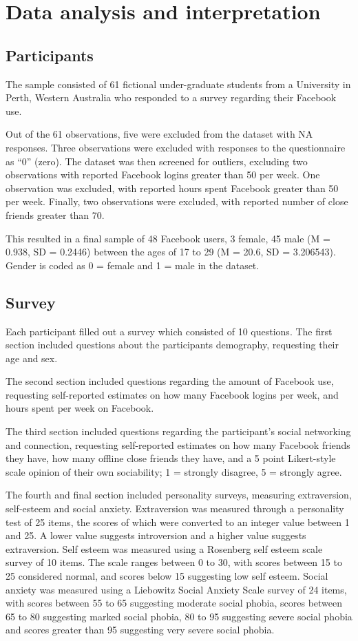 \newpage
\section{Data analysis and interpretation}

\subsection{Participants}

The sample consisted of 61 fictional under-graduate students from a University in Perth, Western Australia who responded to a survey regarding their Facebook use. 

Out of the 61 observations, five were excluded from the dataset with NA responses. Three observations were excluded with responses to the questionnaire as ``0'' (zero). The dataset was then screened for outliers, excluding two observations with reported Facebook logins greater than 50 per week. One observation was excluded, with reported hours spent Facebook greater than 50 per week. Finally, two observations were excluded, with reported number of close friends greater than 70.

This resulted in a final sample of 48 Facebook users, 3 female, 45 male (M = 0.938, SD = 0.2446) between the ages of 17 to 29 (M = 20.6, SD = 3.206543). Gender is coded as 0 = female and 1 = male in the dataset.

\subsection{Survey}

Each participant filled out a survey which consisted of 10 questions. The first section included questions about the participants demography, requesting their age and sex. 

The second section included questions regarding the amount of Facebook use, requesting self-reported estimates on how many Facebook logins per week, and hours spent per week on Facebook. 

The third section included questions regarding the participant's social networking and connection, requesting self-reported estimates on how many Facebook friends they have, how many offline close friends they have, and a 5 point Likert-style scale opinion of their own sociability; 1 = strongly disagree, 5 = strongly agree. 

The fourth and final section included personality surveys, measuring extraversion, self-esteem and social anxiety. Extraversion was measured through a personality test of 25 items, the scores of which were converted to an integer value between 1 and 25. A lower value suggests introversion and a higher value suggests extraversion. Self esteem was measured using a Rosenberg self esteem scale survey of 10 items. The scale ranges between 0 to 30, with scores between 15 to 25 considered normal, and scores below 15 suggesting low self esteem. Social anxiety was measured using a Liebowitz Social Anxiety Scale survey of 24 items, with scores between 55 to 65 suggesting moderate social phobia, scores between 65 to 80 suggesting marked social phobia, 80 to 95 suggesting severe social phobia and scores greater than 95 suggesting very severe social phobia.

